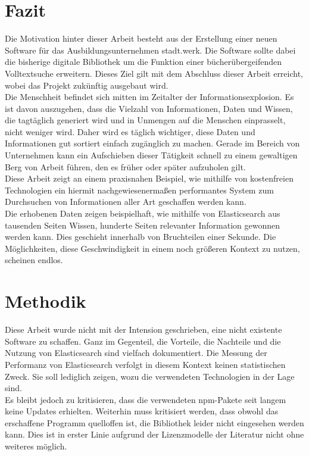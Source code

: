 \documentclass[a4paper]{scrartcl}
\begin{document}
\section{Fazit}
Die Motivation hinter dieser Arbeit besteht aus der Erstellung einer neuen Software für das Ausbildungsunternehmen stadt.werk. Die Software sollte dabei die bisherige digitale Bibliothek um die Funktion einer bücherübergeifenden Volltextsuche erweitern. Dieses Ziel gilt mit dem Abschluss dieser Arbeit erreicht, wobei das Projekt zukünftig ausgebaut wird. \\
Die Menschheit befindet sich mitten im Zeitalter der Informationsexplosion. Es ist davon auszugehen, dass die Vielzahl von Informationen, Daten und Wissen, die tagtäglich generiert wird und in Unmengen auf die Menschen einprasselt, nicht weniger wird. Daher wird es täglich wichtiger, diese Daten und Informationen gut sortiert einfach zugänglich zu machen. Gerade im Bereich von Unternehmen kann ein Aufschieben dieser Tätigkeit schnell zu einem gewaltigen Berg von Arbeit führen, den es früher oder später aufzuholen gilt. \\
Diese Arbeit zeigt an einem praxisnahen Beispiel, wie mithilfe von kostenfreien Technologien ein hiermit nachgewiesenermaßen performantes System zum Durchsuchen von Informationen aller Art geschaffen werden kann. \\

Die erhobenen Daten zeigen beispielhaft, wie mithilfe von Elasticsearch aus tausenden Seiten Wissen, hunderte Seiten relevanter Information gewonnen werden kann. Dies geschieht innerhalb von Bruchteilen einer Sekunde. Die Möglichkeiten, diese Geschwindigkeit in einem noch größeren Kontext zu nutzen, scheinen endlos. 

\newpage

\section{Methodik}
Diese Arbeit wurde nicht mit der Intension geschrieben, eine nicht existente Software zu schaffen. Ganz im Gegenteil, die Vorteile, die Nachteile und die Nutzung von Elasticsearch sind vielfach dokumentiert. Die Messung der Performanz von Elasticsearch verfolgt in diesem Kontext keinen statistischen Zweck. Sie soll lediglich zeigen, wozu die verwendeten Technologien in der Lage sind. \\

Es bleibt jedoch zu kritisieren, dass die verwendeten npm-Pakete seit langem keine Updates erhielten. Weiterhin muss kritisiert werden, dass obwohl das erschaffene Programm quelloffen ist, die Bibliothek leider nicht eingesehen werden kann. Dies ist in erster Linie aufgrund der Lizenzmodelle der Literatur nicht ohne weiteres möglich.
\end{document}
